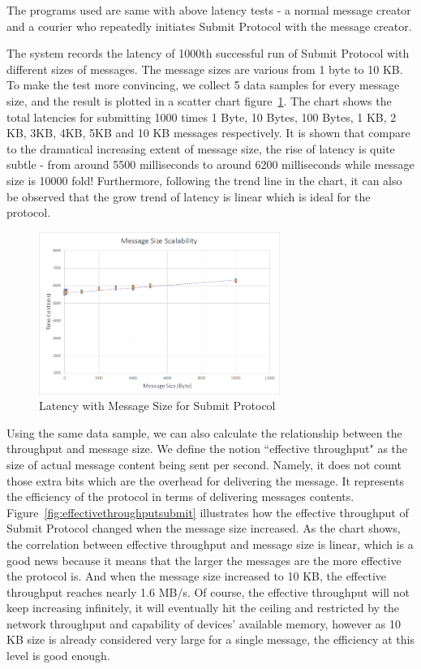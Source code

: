 The programs used are same with above latency tests - a normal message creator and a courier who repeatedly initiates Submit Protocol with the message creator.

The system records the latency of 1000th successful run of Submit Protocol with different sizes of messages. The message sizes are various from 1 byte to 10 KB. To make the test more convincing, we collect 5 data samples for every message size, and the result is plotted in a scatter chart figure~\ref{fig:messagesizesubmit}. The chart shows the total latencies for submitting 1000 times 1 Byte, 10 Bytes, 100 Bytes, 1 KB, 2 KB, 3KB, 4KB, 5KB and 10 KB messages respectively. It is shown that compare to the dramatical increasing extent of message size, the rise of latency is quite subtle - from around 5500 milliseconds to around 6200 milliseconds while message size is 10000 fold! Furthermore, following the trend line in the chart, it can also be observed that the grow trend of latency is linear which is ideal for the protocol.

\begin{figure}[h!]
\centering
\includegraphics[width=0.7\textwidth,natwidth=741,natheight=499]{figures/messagesizesubmit.png}
\caption{Latency with Message Size for Submit Protocol}
\label{fig:messagesizesubmit}
\end{figure}

Using the same data sample, we can also calculate the relationship between the throughput and message size. We define the notion ``effective throughput" as the size of actual message content being sent per second. Namely, it does not count those extra bits which are the overhead for delivering the message. It represents the efficiency of the protocol in terms of delivering messages contents. Figure~\ref{fig:effectivethroughputsubmit} illustrates how the effective throughput of Submit Protocol changed when the message size increased. As the chart shows, the correlation between effective throughput and message size is linear, which is a good news because it means that the larger the messages are the more effective the protocol is. And when the message size increased to 10 KB, the effective throughput reaches nearly 1.6 MB/s. Of course, the effective throughput will not keep increasing infinitely, it will eventually hit the ceiling and restricted by the network throughput and capability of devices' available memory, however as 10 KB size is already considered very large for a single message, the efficiency at this level is good enough.

